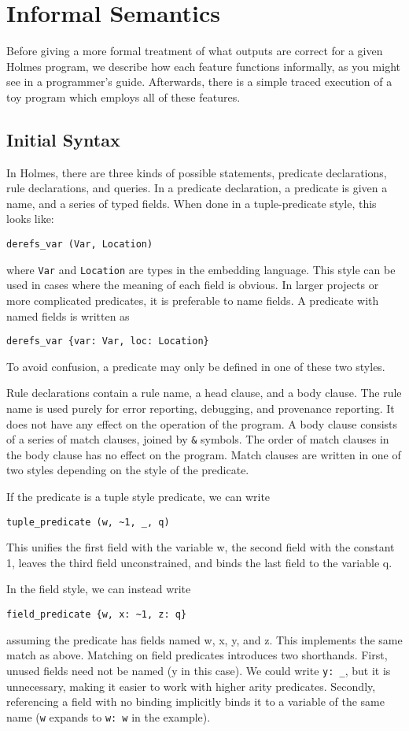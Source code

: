 \section{Informal Semantics}
Before giving a more formal treatment of what outputs are correct for a given Holmes program, we describe how each feature functions informally, as you might see in a programmer's guide.
Afterwards, there is a simple traced execution of a toy program which employs all of these features.
\subsection{Initial Syntax}
In Holmes, there are three kinds of possible statements, predicate declarations, rule declarations, and queries.
In a predicate declaration, a predicate is given a name, and a series of typed fields.
When done in a tuple-predicate style, this looks like:
\begin{verbatim}
derefs_var (Var, Location)
\end{verbatim}
where \texttt{Var} and \texttt{Location} are types in the embedding language.
This style can be used in cases where the meaning of each field is obvious.
In larger projects or more complicated predicates, it is preferable to name fields.
A predicate with named fields is written as
\begin{verbatim}
derefs_var {var: Var, loc: Location}
\end{verbatim}
To avoid confusion, a predicate may only be defined in one of these two styles.

Rule declarations contain a rule name, a head clause, and a body clause.
The rule name is used purely for error reporting, debugging, and provenance reporting.
It does not have any effect on the operation of the program.
A body clause consists of a series of match clauses, joined by \texttt{\&} symbols.
The order of match clauses in the body clause has no effect on the program.
Match clauses are written in one of two styles depending on the style of the predicate.

If the predicate is a tuple style predicate, we can write
\begin{verbatim}
tuple_predicate (w, ~1, _, q)
\end{verbatim}
This unifies the first field with the variable w, the second field with the constant 1, leaves the third field unconstrained, and binds the last field to the variable q.

In the field style, we can instead write
\begin{verbatim}
field_predicate {w, x: ~1, z: q}
\end{verbatim}
assuming the predicate has fields named w, x, y, and z.
This implements the same match as above.
Matching on field predicates introduces two shorthands.
First, unused fields need not be named (y in this case).
We could write \texttt{y: \_}, but it is unnecessary, making it easier to work with higher arity predicates.
Secondly, referencing a field with no binding implicitly binds it to a variable of the same name (\texttt{w} expands to \texttt{w: w} in the example).

